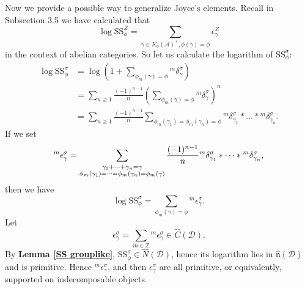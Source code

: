 \documentclass[a4paper,12pt]{amsart}
\newcommand{\Ss}{\mathrm{SS}}
\begin{document}
Now we provide a possible way to generalize Joyce's elements. Recall in Subsection 3.5 we have calculated that
\[\log\Ss^Z_\phi=\sum_{\gamma\in K_0(\mathcal{A})^+,\phi(\gamma)=\phi}\epsilon^Z_\gamma\]
in the context of abelian categories. So let us calculate the logarithm of $\Ss^\sigma_\phi$:
\begin{align*}
    \log\Ss^\sigma_\phi&=\log\left(1+\sum_{\phi_m(\gamma)=\phi}{^m}\delta^\sigma_\gamma\right)\\
    &=\sum_{n\geqslant1}\frac{(-1)^{n-1}}{n}\left(\sum_{\phi_m(\gamma)=\phi}{^m}\delta^\sigma_\gamma\right)^n\\
    &=\sum_{n\geqslant1}\frac{(-1)^{n-1}}{n}\sum_{\phi_m(\gamma_1)=\phi_m(\gamma_n)=\phi}{^m}\delta^\sigma_{\gamma_1}*\dots*{^m}\delta^\sigma_{\gamma_n}.
\end{align*}
If we set
\[{^m}\epsilon^\sigma_\gamma=\sum_{\begin{subarray}{c}
    \\ \gamma_1+\dots+\gamma_n=\gamma\\
   \phi_m(\gamma_1)=\dots=\phi_m(\gamma_n)=\phi_m(\gamma) 
\end{subarray}}\frac{(-1)^{n-1}}{n}{^m}\delta^\sigma_{\gamma_1}*\dots*{^m}\delta^\sigma_{\gamma_n},\]
then we have
\[\log\Ss^\sigma_\phi=\sum_{\phi_m(\gamma)=\phi}{^m}\epsilon^\sigma_\gamma.\]
Let
\[\epsilon^\sigma_\gamma=\sum_{m\in \mathbb{Z}}{^m}\epsilon^\sigma_\gamma\in\hat{C}(\mathcal{D}).\]
By \textbf{Lemma \ref{SS grouplike}}, $\Ss^\sigma_\phi\in\hat{N}(\mathcal{D})$, hence its logarithm lies in $\hat{\mathfrak{n}}(\mathcal{D})$ and is primitive. Hence ${^m}\epsilon^\sigma_\gamma$, and then $\epsilon^\sigma_\gamma$ are all primitive, or equivalently, supported on indecomposable objects.
\end{document}
